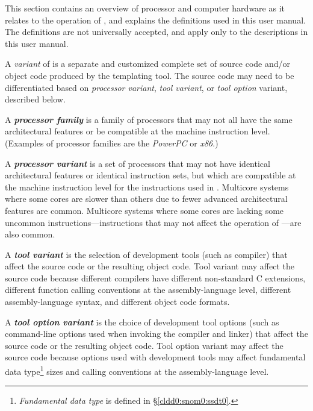 This section contains an overview of processor and computer hardware
as it relates to the operation of \emph{\productbasenameshort{}},
and explains the definitions used in this user manual.  The definitions
are not universally accepted, and apply only to the descriptions in this
user manual.

A \emph{variant} of \emph{\productbasenameshort{}} is a separate
and customized complete set of \emph{\productbasenameshort{}}
source code and/or object code 
produced by the templating tool.  The
\emph{\productbasenameshort{}} source code may need to
be differentiated based on \emph{processor variant},
\emph{tool variant},
or \emph{tool option} variant, described below.

A \emph{\textbf{processor family}} is
a family of processors that may not all have the same 
architectural features or be compatible at the machine instruction 
level.  (Examples of processor families are the \emph{PowerPC} or 
\emph{x86}.)

A \emph{\textbf{processor variant}} is
a set of processors that may not have identical architectural
features or identical instruction sets, but which are compatible
at the machine instruction level for the instructions used in
\emph{\productbasenameshort{}}\@.  Multicore systems where
some cores are slower than others due to fewer advanced architectural
features are common.  Multicore systems where some cores are lacking
some uncommon instructions---instructions that may not affect
the operation of \emph{\productbasenameshort{}}---are also common.

A \emph{\textbf{tool variant}} is the selection
of development tools (such as compiler) that affect the
\emph{\productbasenameshort{}} source code or the resulting
object code.  Tool variant may affect the \emph{\productbasenameshort{}}
source code because different compilers have different non-standard
C extensions, different function calling conventions at the
assembly-language level, different assembly-language syntax, and different
object code formats.

A \emph{\textbf{tool option variant}}
is the choice of development tool options (such as command-line options used
when invoking the compiler and linker) that affect the
\emph{\productbasenameshort{}} source code or the resulting
object code.  Tool option variant may affect the \emph{\productbasenameshort{}}
source code because options used with development tools may
affect fundamental data type\footnote{\emph{Fundamental data type}
is defined in \S{}\ref{cldd0:snom0:ssdt0}.} sizes and calling conventions at the
assembly-language level.

